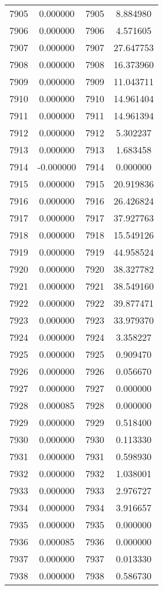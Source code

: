 \documentclass[12pt]{article}
\begin{document}
\begin{longtable}{@{}cccc@{}}
7905 & 0.000000 & 7905 & 8.884980 \\
7906 & 0.000000 & 7906 & 4.571605 \\
7907 & 0.000000 & 7907 & 27.647753 \\
7908 & 0.000000 & 7908 & 16.373960 \\
7909 & 0.000000 & 7909 & 11.043711 \\
7910 & 0.000000 & 7910 & 14.961404 \\
7911 & 0.000000 & 7911 & 14.961394 \\
7912 & 0.000000 & 7912 & 5.302237 \\
7913 & 0.000000 & 7913 & 1.683458 \\
7914 & -0.000000 & 7914 & 0.000000 \\
7915 & 0.000000 & 7915 & 20.919836 \\
7916 & 0.000000 & 7916 & 26.426824 \\
7917 & 0.000000 & 7917 & 37.927763 \\
7918 & 0.000000 & 7918 & 15.549126 \\
7919 & 0.000000 & 7919 & 44.958524 \\
7920 & 0.000000 & 7920 & 38.327782 \\
7921 & 0.000000 & 7921 & 38.549160 \\
7922 & 0.000000 & 7922 & 39.877471 \\
7923 & 0.000000 & 7923 & 33.979370 \\
7924 & 0.000000 & 7924 & 3.358227 \\
7925 & 0.000000 & 7925 & 0.909470 \\
7926 & 0.000000 & 7926 & 0.056670 \\
7927 & 0.000000 & 7927 & 0.000000 \\
7928 & 0.000085 & 7928 & 0.000000 \\
7929 & 0.000000 & 7929 & 0.518400 \\
7930 & 0.000000 & 7930 & 0.113330 \\
7931 & 0.000000 & 7931 & 0.598930 \\
7932 & 0.000000 & 7932 & 1.038001 \\
7933 & 0.000000 & 7933 & 2.976727 \\
7934 & 0.000000 & 7934 & 3.916657 \\
7935 & 0.000000 & 7935 & 0.000000 \\
7936 & 0.000085 & 7936 & 0.000000 \\
7937 & 0.000000 & 7937 & 0.013330 \\
7938 & 0.000000 & 7938 & 0.586730 \\

\end{longtable}
\end{document}
